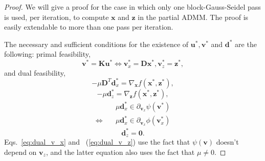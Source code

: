 \documentclass[10pt,twocolumn,twoside]{IEEEtran}
\newcommand{\x}{\mathbf{x}} %
\newcommand{\z}{\mathbf{z}} %
\newcommand{\vs}{\mathbf{v}} %
\newcommand{\dv}{\mathbf{d}} %
\newcommand{\D}{\mathbf{D}} %
\newcommand{\K}{\mathbf{K}} %
\newcommand{\uu}{\mathbf{u}} %
\begin{document}
\begin{proof}
	
	We will give a proof for the case in which only one block-Gauss-Seidel pass is used, per iteration, to compute $\x$ and $\z$ in the partial ADMM. The proof is easily extendable to more than one pass per iteration.
	
	The necessary and sufficient conditions for the existence of $\uu^*, \vs^*$ and $\dv^*$ are the following: primal feasibility,
	\begin{equation} \label{eq:primal}
	\vs^* = \K \uu^* \Leftrightarrow \vs_x^* = \D \x^*, \vs_z^* = \z^*,
	\end{equation}
	and dual feasibility,
	\begin{equation} \label{eq:dual_x}
	- \mu \D^{T} \dv_x^* = \nabla_{\x} f(\x^*, \z^*),
	\end{equation}
	\begin{equation} \label{eq:dual_z}
	- \mu \dv_z^* = \nabla_\z f(\x^*, \z^*),
	\end{equation}
	\begin{align}
	&\mu \dv_x^* \in \partial_{\vs_x} \psi(\vs^*) \nonumber \\
	\Leftrightarrow \quad &\mu \dv_x^* \in \partial_{\vs_x} \phi(\vs_x^*)  \label{eq:dual_v_x}
	\end{align}
	\begin{equation} \label{eq:dual_v_z}
	\dv_z^* = \mathbf{0}.
	\end{equation}
	Eqs.~\eqref{eq:dual_v_x} and ~(\ref{eq:dual_v_z}) use the fact that $\psi(\vs)$ doesn't depend on $\vs_z$, and the latter equation also uses the fact that $\mu \neq 0$.	
	
	
	

\end{proof}
\end{document}
